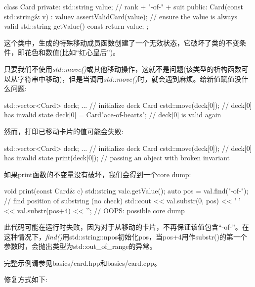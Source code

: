 \begin{cppcode}
class Card {
private:
	std::string value; // rank + "-of-" + suit
public:
	Card(const std::string& v)
	: value{v} {
		assertValidCard(value); // ensure the value is always valid
	}
	std::string getValue() const {
		return value;
	}
};
\end{cppcode}

这个类中，生成的特殊移动成员函数创建了一个无效状态，它破坏了类的不变条件，即花色和数值(比如“红心皇后”)。

只要我们不使用\textit{std::move()}或其他移动操作，这就不是问题(该类型的析构函数可以从字符串中移动)，但是当调用\textit{std::move()}时，就会遇到麻烦。给新值赋值没什么问题:

\begin{cppcode}
std::vector<Card> deck;
... // initialize deck
Card c{std::move(deck[0])}; // deck[0] has invalid state
deck[0] = Card{"ace-of-hearts"}; // deck[0] is valid again
\end{cppcode}

然而，打印已移动卡片的值可能会失败:

\begin{cppcode}
std::vector<Card> deck;
... // initialize deck
Card c{std::move(deck[0])}; // deck[0] has invalid state
print(deck[0]); // passing an object with broken invariant
\end{cppcode}

如果print函数的不变量没有破坏，我们会得到一个core dump:

\begin{cppcode}
void print(const Card& c) {
	std::string val{c.getValue()};
	auto pos = val.find("-of-"); // find position of substring (no check)
	std::cout << val.substr(0, pos) << ' '
	<< val.substr(pos+4) << '\n'; // OOPS: possible core dump
}
\end{cppcode}

此代码可能在运行时失败，因为对于从移动的卡片，不再保证该值包含“-of-”。在这种情况下，\textit{find()}用std::string::npos初始化pos，当pos+4用作substr()的第一个参数时，会抛出类型为std::out_of_range的异常。

完整示例请参见basics/card.hpp和basics/card.cpp。

修复方式如下:

